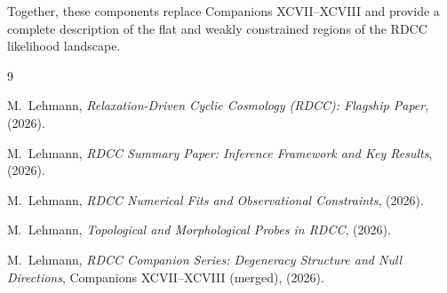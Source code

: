 \documentclass[11pt,a4paper]{article}
\begin{document}
Together, these components replace Companions XCVII--XCVIII and provide a 
complete description of the flat and weakly constrained regions of the RDCC 
likelihood landscape.

\begin{thebibliography}{9}

M.~Lehmann,
\textit{Relaxation-Driven Cyclic Cosmology (RDCC): Flagship Paper},
(2026).

M.~Lehmann,
\textit{RDCC Summary Paper: Inference Framework and Key Results},
(2026).

M.~Lehmann,
\textit{RDCC Numerical Fits and Observational Constraints},
(2026).

M.~Lehmann,
\textit{Topological and Morphological Probes in RDCC},
(2026).

M.~Lehmann,
\textit{RDCC Companion Series: Degeneracy Structure and Null Directions},
Companions XCVII--XCVIII (merged), (2026).

\end{thebibliography}
\end{document}
